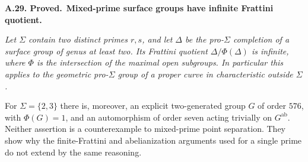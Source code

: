 \documentclass[11pt,a4paper]{article}
\newenvironment{claim}[3]{\par\medskip\noindent\hypertarget{#1}{\textbf{#1. #2.}}\ \textbf{#3.}\par\nopagebreak\smallskip\begingroup\itshape}{\endgroup\par\smallskip}
\begin{document}
\begin{claim}{A.29}{Proved}{Mixed-prime surface groups have infinite Frattini quotient}
Let $\Sigma$ contain two distinct primes $r,s$, and let $\Delta$
be the pro-$\Sigma$ completion of a surface group of genus at least
two. Its Frattini quotient $\Delta/\Phi(\Delta)$ is infinite,
where $\Phi$ is the intersection of the maximal open subgroups.
In particular this applies to the geometric pro-$\Sigma$ group
of a proper curve in characteristic outside $\Sigma$.

For $\Sigma=\{2,3\}$ there is, moreover, an explicit two-generated
group $G$ of order $576$, with $\Phi(G)=1$, and an automorphism of
order seven acting trivially on $G^{\mathrm{ab}}$.
Neither assertion is a counterexample to mixed-prime point separation.
They show why the finite-Frattini and abelianization arguments used
for a single prime do not extend by the same reasoning.
\end{claim}
\end{document}
